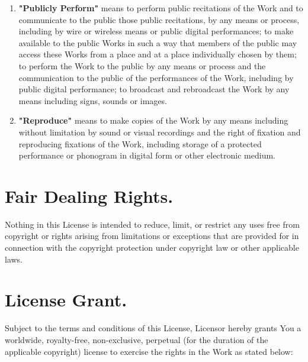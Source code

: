 \begin{enumerate}
\item \textbf{"Publicly Perform"} means to perform
  public recitations of the Work and to communicate to the
  public those public recitations, by any means or process,
  including by wire or wireless means or public digital
  performances; to make available to the public Works in
  such a way that members of the public may access these
  Works from a place and at a place individually chosen by
  them; to perform the Work to the public by any means or
  process and the communication to the public of the
  performances of the Work, including by public digital
  performance; to broadcast and rebroadcast the Work by any
  means including signs, sounds or images.

\item \textbf{"Reproduce"} means to make copies of
  the Work by any means including without limitation by
  sound or visual recordings and the right of fixation and
  reproducing fixations of the Work, including storage of a
  protected performance or phonogram in digital form or
  other electronic medium.
\end{enumerate}

\section{Fair Dealing Rights.} Nothing in this
License is intended to reduce, limit, or restrict any uses
free from copyright or rights arising from limitations or
exceptions that are provided for in connection with the
copyright protection under copyright law or other
applicable laws.

\section{License Grant.} Subject to the terms
and conditions of this License, Licensor hereby grants You
a worldwide, royalty-free, non-exclusive, perpetual (for
the duration of the applicable copyright) license to
exercise the rights in the Work as stated below:

